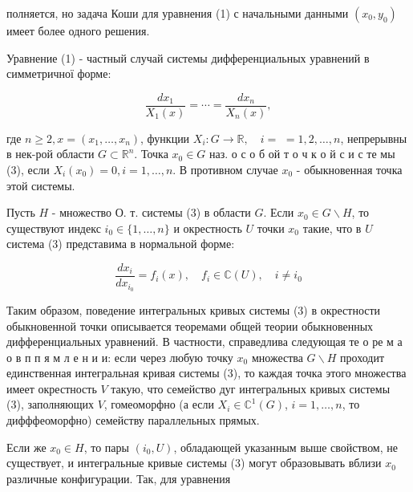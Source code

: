 \documentclass[10pt]{article}
\begin{document}
полняется, но задача Коши для уравнения (1) с начальными данными $\left(x_{0}, y_{0}\right)$ имеет более одного решения.



Уравнение (1) - частный случай системы дифференциальных уравнений в симметричної форме:



\[

\frac{d x_{1}}{X_{1}(x)}=\cdots=\frac{d x_{n}}{X_{n}(x)},

\]



где $n \geqslant 2, x=\left(x_{1}, \ldots, x_{n}\right)$, функции $X_{i}: G \rightarrow \mathbb{R}, \quad i=$ $=1,2, \ldots, n$, непрерывны в нек-рой области $G \subset \mathbb{R}^{n}$. Точка $x_{0} \in G$ наз. о с о б ой т о ч к о й с и с те мы (3), если $X_{i}\left(x_{0}\right)=0, i=1, \ldots, n$. В противном случае $x_{0}$ - обыкновенная точка этой системы.



Пусть $H$ - множество О. т. системы (3) в области $G$. Если $x_{0} \in G \backslash H$, то существуют индекс $i_{0} \in\{1, \ldots, n\}$ и окрестность $U$ точки $x_{0}$ такие, что в $U$ система (3) представима в нормальной форме:



\[

\frac{d x_{i}}{d x_{i_{0}}}=f_{i}(x), \quad f_{i} \in \mathbb{C}(U), \quad i \neq i_{0}

\]



Таким образом, поведение интегральных кривых системы (3) в окрестности обыкновенной точки описывается теоремами общей теории обыкновенных дифференциальных уравнений. В частности, справедлива следующая те о ре м а о в п п я м л е н и и: если через любую точку $x_{0}$ множества $G \backslash H$ проходит единственная интегральная кривая системы (3), то каждая точка этого множества имеет окрестность $V$ такую, что семейство дуг интегральных кривых системы (3), заполняющих $V$, гомеоморфно (а если $X_{i} \in \mathbb{C}^{1}(G)$, $i=1, \ldots, n$, то дифффеоморфно) семейству параллельных прямых.



Если же $x_{0} \in H$, то пары $\left(i_{0}, U\right)$, обладающей указанным выше свойством, не существует, и интегральные кривые системы (3) могут образовывать вблизи $x_{0}$ различные конфигурации. Так, для уравнения
\end{document}
